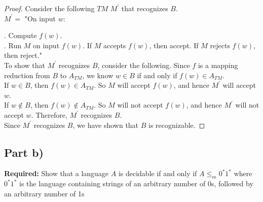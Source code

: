 \documentclass[12pt]{article}
\begin{document}
\begin{proof}
Consider the following $TM$ $M^\prime$ that recognizes $B$. \\

$M^\prime = $ "On input $w$: \\

\setlength\parindent{15pt}

. Compute $f(w)$. \\

. Run $M$ on input $f(w)$. If $M$ accepts $f(w)$, then accept. If $M$ rejects $f(w)$, then reject." \\

\setlength\parindent{0pt}
To show that $M^\prime$ recognizes $B$, consider the following. Since $f$ is a mapping reduction from $B$ to $A_{TM}$, we know $w \in B$ if and only if $f(w) \in A_{TM}$. \\

If $w \in B$, then $f(w) \in A_{TM}$. So $M$ will accept $f(w)$, and hence $M^\prime$ will accept $w$. \\

If $w \not \in B$, then $f(w) \not \in A_{TM}$. So $M$ will not accept $f(w)$, and hence $M^\prime$ will not accept $w$. Therefore, $M^\prime$ recognizes $B$. \\

Since $M^\prime$ recognizes $B$, we have shown that $B$ is recognizable.
\end{proof}

\subsection*{Part b)}

\textbf{Required:} Show that a language $A$ is decidable if and only if $A \leq_m 0^*1^*$ where $0^*1^*$ is the language containing strings of an arbitrary number of 0s, followed by an arbitrary number of 1s
\end{document}
